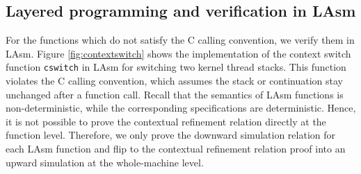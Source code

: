 \subsection{Layered programming and verification in LAsm}
For the functions which do not satisfy the C calling convention, we verify them in 
LAsm. Figure \ref{fig:contextswitch} shows the implementation of the context switch function
\verb"cswitch" in LAsm for switching two kernel thread stacks. This function violates
the C calling convention, which assumes the stack or continuation stay unchanged after
a function call.
Recall that the semantics of LAsm functions is non-deterministic, while the
corresponding  specifications are deterministic.
Hence, it is not possible to prove the contextual refinement relation 
directly at the function level. 
Therefore, we only prove the downward simulation relation for each LAsm function
and flip to the contextual refinement relation proof into an upward simulation
at the whole-machine level. 






